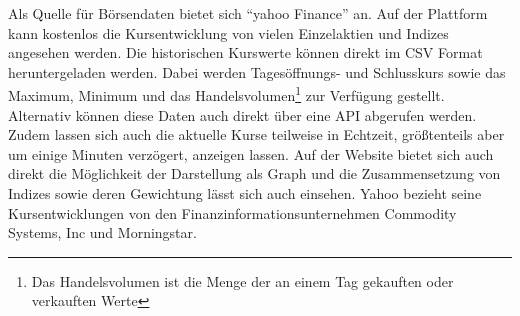 

Als Quelle für Börsendaten bietet sich \enquote{yahoo Finance} an. Auf der Plattform kann kostenlos die Kursentwicklung von vielen Einzelaktien und Indizes angesehen werden. Die historischen Kurswerte können direkt im \gls{CSV} Format heruntergeladen werden. Dabei werden Tagesöffnungs- und Schlusskurs sowie das Maximum, Minimum und das Handelsvolumen\footnote{Das Handelsvolumen ist die Menge der an einem Tag gekauften oder verkauften Werte} zur Verfügung gestellt. Alternativ können diese Daten auch direkt über eine \gls{API} abgerufen werden. Zudem lassen sich auch die aktuelle Kurse teilweise in Echtzeit, größtenteils aber um einige Minuten verzögert, anzeigen lassen. Auf der Website bietet sich auch direkt die Möglichkeit der Darstellung als Graph und die Zusammensetzung von Indizes sowie deren Gewichtung lässt sich auch einsehen. Yahoo bezieht seine Kursentwicklungen von den Finanzinformationsunternehmen Commodity Systems, Inc und Morningstar.

\clearpage
